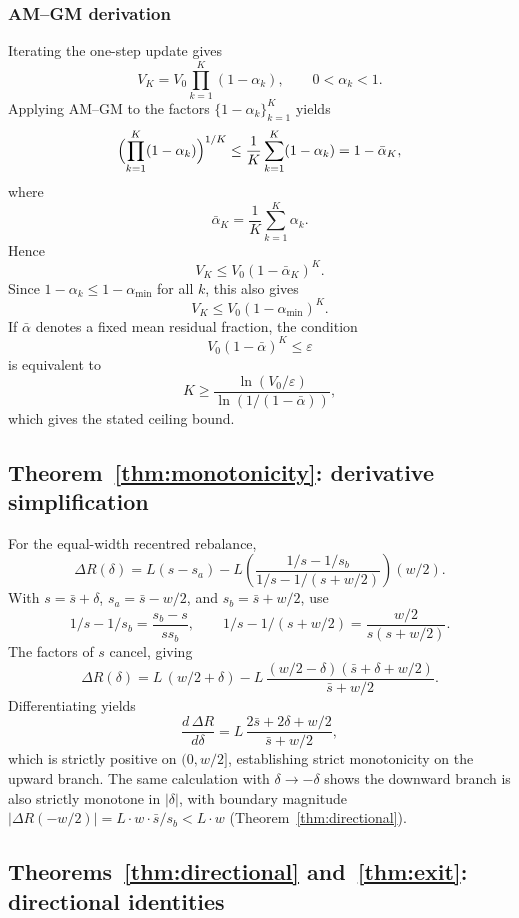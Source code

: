 \documentclass[11pt,a4paper]{article}
\theoremstyle{plain}
\begin{document}
\subsubsection*{AM--GM derivation}

Iterating the one-step update gives
\[
V_K = V_0 \prod_{k=1}^{K} (1 - \alpha_k),
\qquad 0 < \alpha_k < 1.
\]
Applying AM--GM to the factors $\{1-\alpha_k\}_{k=1}^K$ yields
\[
\Bigl(\prod_{k=1}^K (1 - \alpha_k)\Bigr)^{1/K}
\leq
\frac{1}{K}\sum_{k=1}^K (1 - \alpha_k)
=
1 - \bar\alpha_K,
\]
where
\[
\bar\alpha_K = \frac{1}{K}\sum_{k=1}^K \alpha_k.
\]
Hence
\[
V_K \leq V_0(1 - \bar\alpha_K)^K.
\]
Since $1 - \alpha_k \leq 1 - \alpha_{\min}$ for all $k$, this also gives
\[
V_K \leq V_0(1 - \alpha_{\min})^K.
\]
If $\bar\alpha$ denotes a fixed mean residual fraction, the condition
\[
V_0(1 - \bar\alpha)^K \leq \varepsilon
\]
is equivalent to
\[
K \geq \frac{\ln(V_0/\varepsilon)}{\ln(1/(1-\bar\alpha))},
\]
which gives the stated ceiling bound.

\subsection{Theorem~\ref{thm:monotonicity}: derivative simplification}

For the equal-width recentred rebalance,
\begin{equation}\label{eq:dr-closed-form-app}
\Delta R(\delta) = L(s - s_a) - L\!\left(\frac{1/s - 1/s_b}{1/s - 1/(s + w/2)}\right)(w/2).
\end{equation}
With $s = \bar s + \delta$, $s_a = \bar s - w/2$, and $s_b = \bar s + w/2$, use
\[
1/s - 1/s_b = \frac{s_b - s}{s s_b},
\qquad
1/s - 1/(s + w/2) = \frac{w/2}{s(s + w/2)}.
\]
The factors of $s$ cancel, giving
\begin{equation}\label{eq:g-simplified}
\Delta R(\delta)
=
L\,(w/2 + \delta)
-
L\,\frac{(w/2 - \delta)(\bar s + \delta + w/2)}{\bar s + w/2}.
\end{equation}
Differentiating yields
\[
\frac{d\,\Delta R}{d\delta}
=
L\,\frac{2\bar s + 2\delta + w/2}{\bar s + w/2},
\]
which is strictly positive on \((0,w/2]\), establishing strict monotonicity on the upward branch. The same calculation with $\delta \to -\delta$ shows the downward branch is also strictly monotone in $|\delta|$, with boundary magnitude $|\Delta R(-w/2)| = L \cdot w \cdot \bar{s}/s_b < L \cdot w$ (Theorem~\ref{thm:directional}).

\subsection{Theorems~\ref{thm:directional} and~\ref{thm:exit}: directional identities}
\end{document}
